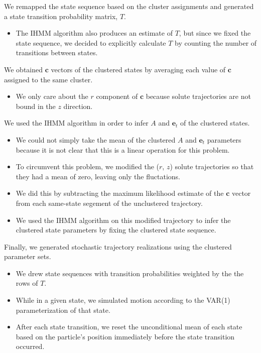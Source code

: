 \documentclass{article}
\begin{document}
  We remapped the state sequence based on the cluster assignments and
  generated a state transition probability matrix, $T$.
  \begin{itemize}
   \item The IHMM algorithm also produces an estimate of $T$, but since we 
   fixed the state sequence, we decided to explicitly calculate $T$ by 
   counting the number of transitions between states.
  \end{itemize}  
  
  We obtained $\mathbf{c}$ vectors of the clustered states by averaging 
  each value of $\mathbf{c}$ assigned to the same cluster.
  \begin{itemize}
   \item We only care about the $r$ component of $\mathbf{c}$ because solute
   trajectories are not bound in the $z$ direction.
  \end{itemize}
  
  We used the IHMM algorithm in order to infer $A$ and $\mathbf{e}_t$ of the 
  clustered states.
  \begin{itemize}
   \item We could not simply take the mean of the clustered 
   $A$ and $\mathbf{e}_t$ parameters because it is not clear that this is a linear 
   operation for this problem. 
   \item To circumvent this problem, we modified the ($r$, $z$) solute
   trajectories so that they had a mean of zero, leaving only the 
   fluctations. 
   \item We did this by subtracting the maximum likelihood estimate
   of the $\mathbf{c}$ vector from each same-state segement of the unclustered
   trajectory.   
   \item We used the IHMM algorithm on this modified trajectory to infer
   the clustered state parameters by fixing the clustered state sequence. 
  \end{itemize}
  
  Finally, we generated stochastic trajectory realizations using the clustered
  parameter sets.
  \begin{itemize}
    \item We drew state sequences with transition probabilities weighted by the 
    the rows of $T$.
    \item While in a given state, we simulated motion according to the VAR(1)
    parameterization of that state.
    \item After each state transition, we reset the unconditional mean of each 
    state based on the particle's position immediately before the state transition
    occurred.
  \end{itemize} 
  
\end{document}
